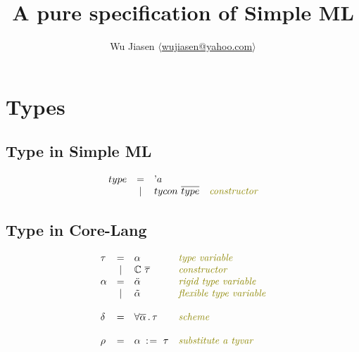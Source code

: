 \documentclass[11pt,a4paper]{article}
\newcommand{\rigdvar}[1]{\ddot{#1}}
\newcommand{\flexvar}[1]{\tilde#1}
\newcommand{\tyvarsubst}[2]{#1\ \hspace{-0.2ex}:\hspace{1pt}=\ #2}
\newcommand{\comment}[1]{\textit{\color{olive}#1}}
\newcommand{\type}{\tau}
\newcommand{\scheme}{\delta}
\newcommand{\substitute}{\rho}
\newcommand{\tycon}{\mathbb{C}}
\newcommand{\vect}[1]{\overline{#1}}
\begin{document}
\title {A pure specification of Simple ML}
\author{Wu Jiasen $\langle$\href{mailto:wujiasen@yahoo.com}{wujiasen@yahoo.com}$\rangle$}
\maketitle 
\thispagestyle{fancy}

\section{Types}
\subsection{Type in Simple ML}
\newcommand{\q}     {\textrm{'}}
\newcommand{\inTE}  {\ \in^{\textrm{\tiny TE}}\  }
\[\begin{array}{lcll}
type & = & \q a                                             & \\
     & | & tycon\ \vect{type}              	            	&\comment{constructor}\\
\end{array}\]

\subsection{Type in Core-Lang}
{\renewcommand{\arraystretch}{1.2}\[
\begin{array}{lcll}
\type
     & = & \alpha                                           &\comment{type variable} \\
     & | & \tycon\ \vect\type              	            	&\comment{constructor}\\
\alpha 
     & = & \rigdvar{\alpha}                                 &\comment{rigid type variable}\\
     & | & \flexvar{\alpha}                                 &\comment{flexible type variable}\\     
\\     
\scheme 
     & = & \forall \vect{\alpha}\,.\,\type
                                                            &\comment{scheme}\\
\\
\substitute
     & = & \tyvarsubst{\alpha}{\type}                   	&\comment{substitute a tyvar}\\
\end{array}
\]}
\end{document}
